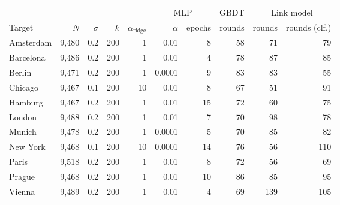 \begin{tabular}{lrrrrrrrrr}
\toprule
& & & & & \multicolumn{2}{c}{MLP} & GBDT & \multicolumn{2}{c}{Link model} \\
\cmidrule(lr){6-7}\cmidrule(lr){9-10}
Target & $N$ & $\sigma$ & $k$ & $\alpha_{\mathrm{ridge}}$ & $\alpha$ & epochs & rounds & rounds & rounds (clf.) \\
\midrule
Amsterdam & 9{,}480 & 0.2 & 200 & 1 & 0.01 & 8 & 58 & 71 & 79 \\
Barcelona & 9{,}486 & 0.2 & 200 & 1 & 0.01 & 4 & 78 & 87 & 85 \\
Berlin & 9{,}471 & 0.2 & 200 & 1 & 0.0001 & 9 & 83 & 83 & 55 \\
Chicago & 9{,}467 & 0.1 & 200 & 10 & 0.01 & 8 & 67 & 51 & 91 \\
Hamburg & 9{,}467 & 0.2 & 200 & 1 & 0.01 & 15 & 72 & 60 & 75 \\
London & 9{,}488 & 0.2 & 200 & 1 & 0.01 & 7 & 70 & 98 & 78 \\
Munich & 9{,}478 & 0.2 & 200 & 1 & 0.0001 & 5 & 70 & 85 & 82 \\
New York & 9{,}468 & 0.1 & 200 & 10 & 0.0001 & 14 & 76 & 56 & 110 \\
Paris & 9{,}518 & 0.2 & 200 & 1 & 0.01 & 8 & 72 & 56 & 69 \\
Prague & 9{,}468 & 0.2 & 200 & 1 & 0.01 & 10 & 86 & 85 & 95 \\
Vienna & 9{,}489 & 0.2 & 200 & 1 & 0.01 & 4 & 69 & 139 & 105 \\
\bottomrule
\end{tabular}
